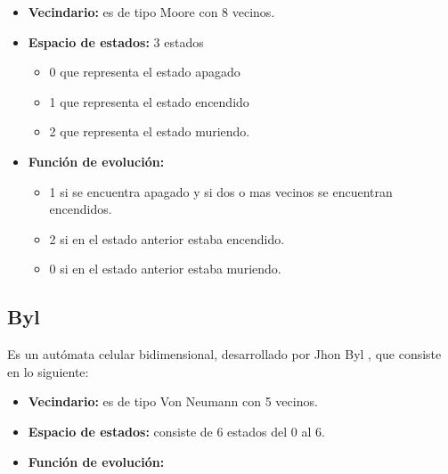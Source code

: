 \begin{itemize}
	\item \textbf{Vecindario:} es de tipo Moore con 8 vecinos.
	\item \textbf{Espacio de estados:} 3 estados
	\begin{itemize}
		\item 0 que representa el estado apagado
		\item 1 que representa el estado encendido
		\item 2 que representa el estado muriendo.
	\end{itemize}
	\item \textbf{Función de evolución:} 
	\begin{itemize}
		\item 1 si se encuentra apagado y si dos o mas vecinos se encuentran encendidos.
		\item 2 si en el estado anterior estaba encendido.
		\item 0 si en el estado anterior estaba muriendo.
	\end{itemize}
\end{itemize}

\subsection{Byl}

Es un autómata celular bidimensional, desarrollado por Jhon Byl \citep{BYL1989295}, que consiste en lo siguiente:

\begin{itemize}
	\item \textbf{Vecindario:} es de tipo Von Neumann con 5 vecinos.
	\item \textbf{Espacio de estados:} consiste de 6 estados del 0 al 6.
	\item \textbf{Función de evolución:} 
\end{itemize}

